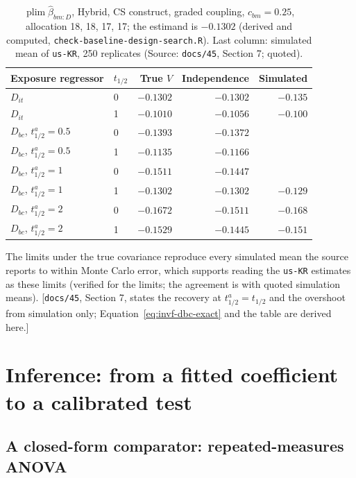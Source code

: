 \documentclass[11pt]{article}
\newcommand{\note}[1]{\textcolor{blue!60!black}{\small [#1]}}
\newcommand{\code}[1]{\texttt{#1}}
\begin{document}
\begin{table}[h]
\centering\small
\caption{$\operatorname{plim}\hat\beta_{bm:D}$, Hybrid, CS construct,
graded coupling, $c_{bm} = 0.25$, allocation 18, 18, 17, 17; the estimand
is $-0.1302$ (derived and computed, \code{check-baseline-design-search.R}). Last column:
simulated mean of \code{us-KR}, 250 replicates (Source: \code{docs/45},
Section 7; quoted).}
\label{tab:invf-dbc}
\begin{tabular}{@{}llrrr@{}}
\toprule
Exposure regressor & $t_{1/2}$ & True $V$ & Independence & Simulated \\
\midrule
$D_{it}$ & 0 & $-0.1302$ & $-0.1302$ & $-0.135$ \\
$D_{it}$ & 1 & $-0.1010$ & $-0.1056$ & $-0.100$ \\
$D_{bc}$, $t_{1/2}^a = 0.5$ & 0 & $-0.1393$ & $-0.1372$ & \\
$D_{bc}$, $t_{1/2}^a = 0.5$ & 1 & $-0.1135$ & $-0.1166$ & \\
$D_{bc}$, $t_{1/2}^a = 1$ & 0 & $-0.1511$ & $-0.1447$ & \\
$D_{bc}$, $t_{1/2}^a = 1$ & 1 & $-0.1302$ & $-0.1302$ & $-0.129$ \\
$D_{bc}$, $t_{1/2}^a = 2$ & 0 & $-0.1672$ & $-0.1511$ & $-0.168$ \\
$D_{bc}$, $t_{1/2}^a = 2$ & 1 & $-0.1529$ & $-0.1445$ & $-0.151$ \\
\bottomrule
\end{tabular}
\end{table}

\noindent The limits under the true covariance reproduce every simulated
mean the source reports to within Monte Carlo error, which supports
reading the \code{us-KR} estimates as these limits (verified for the
limits; the agreement is with quoted simulation means).
\note{\code{docs/45}, Section 7, states the recovery at $t_{1/2}^a =
t_{1/2}$ and the overshoot from simulation only; Equation~\eqref{eq:invf-dbc-exact}
and the table are derived here.}

\section{Inference: from a fitted coefficient to a calibrated test}
\label{sec:inference}

\subsection{A closed-form comparator: repeated-measures ANOVA}
\label{sec:rmanova}
\end{document}

